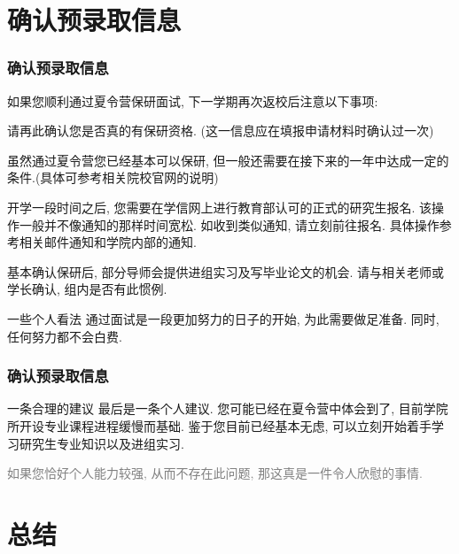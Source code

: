 \documentclass[Blue,dvipsnames]{beamer}
\begin{document}
    \section{确认预录取信息}  
    
    \begin{frame}
    \frametitle{确认预录取信息}
    如果您顺利通过夏令营保研面试, 下一学期再次返校后注意以下事项:
    \begin{description}[leftmargin=!,labelwidth=\widthof{\bfseries 录取信息确认}]
      \small
      \item[保研资格] 请再此确认您是否真的有保研资格. (这一信息应在填报申请材料时确认过一次)
      \item[保研条件] 虽然通过夏令营您已经基本可以保研, 但一般还需要在接下来的一年中达成一定的条件.(具体可参考相关院校官网的说明)
      \item[正式申请] 开学一段时间之后, 您需要在学信网上进行教育部认可的正式的研究生报名. 该操作一般并不像通知的那样时间宽松. 如收到类似通知, 请立刻前往报名. 具体操作参考相关邮件通知和学院内部的通知.
      \item[毕业论文] 基本确认保研后, 部分导师会提供进组实习及写毕业论文的机会. 请与相关老师或学长确认, 组内是否有此惯例. 
    \end{description} 

    {
      \begin{block}{\small{一些个人看法}}
        通过面试是一段更加努力的日子的开始, 为此需要做足准备. 同时, 任何努力都不会白费. 
      \end{block}
    }
    \end{frame}
    \begin{frame}
      \frametitle{确认预录取信息}
      \begin{block}{一条合理的建议}
        最后是一条个人建议. 您可能已经在夏令营中体会到了, 目前学院所开设专业课程进程缓慢而基础. 鉴于您目前已经基本无虑, 可以立刻开始着手学习研究生专业知识以及进组实习. 
      \end{block}
      {\small\textcolor{gray}{如果您恰好个人能力较强, 从而不存在此问题, 那这真是一件令人欣慰的事情.}}
    \end{frame}

    \section{总结}  
\end{document}
